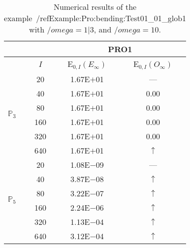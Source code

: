 \begin{table}[H]
\caption{Numerical results of the example~/ref{Example:Pro:bending:Test01_01_glob1} with $/omega=1|3$, and $/omega=10$.}
\setlength{\tabcolsep}{5pt}
\centering
\begin{tabular}{@{}l c c c@{}}
\toprule
 &  & \multicolumn{2}{c}{PRO1}\\
\midrule
 & $I$ & E$_{0,I}(E_{\infty})$ & E$_{0,I}(O_{\infty})$\\
\midrule
\multirow{6}{*}{$\mathbb{P}_{3}$}
 & 20 & 1.67E$+$01 & ---\\
 & 40 & 1.67E$+$01 & 0.00\\
 & 80 & 1.67E$+$01 & 0.00\\
 & 160 & 1.67E$+$01 & 0.00\\
 & 320 & 1.67E$+$01 & 0.00\\
 & 640 & 1.67E$+$01 & $\uparrow$\\
\midrule
\multirow{6}{*}{$\mathbb{P}_{5}$}
 & 20 & 1.08E$-$09 & ---\\
 & 40 & 3.87E$-$08 & $\uparrow$\\
 & 80 & 3.22E$-$07 & $\uparrow$\\
 & 160 & 2.24E$-$06 & $\uparrow$\\
 & 320 & 1.13E$-$04 & $\uparrow$\\
 & 640 & 3.12E$-$04 & $\uparrow$\\
\bottomrule
\end{tabular}
\label{Table:PRO:test_01_01_test12_pro1}
\end{table}

